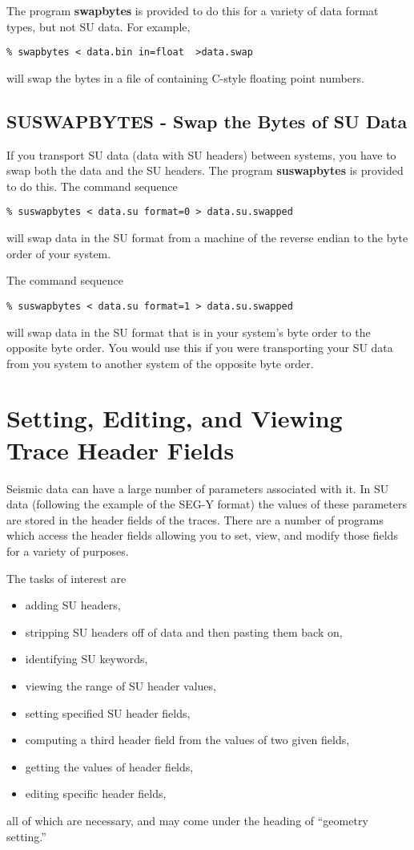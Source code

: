 {{{The program {\bf swapbytes\/} is provided to do this for a variety of
data format types, but not SU data. For example,
{\small\begin{verbatim}
% swapbytes < data.bin in=float  >data.swap
\end{verbatim}}\noindent
will swap the bytes in a file of containing C-style floating point numbers.

\subsection{SUSWAPBYTES - Swap the Bytes of SU Data}

If you transport SU data (data with SU headers) between systems,
you have to swap both the data and the SU headers. The program
{\bf suswapbytes\/} is provided to do this.
The command sequence
{\small\begin{verbatim}
% suswapbytes < data.su format=0 > data.su.swapped
\end{verbatim}}\noindent
will swap data in the SU format from a machine of the reverse endian
to the byte order of your system.

The command sequence
{\small\begin{verbatim}
% suswapbytes < data.su format=1 > data.su.swapped
\end{verbatim}}\noindent
will swap data in the SU format that is in your system's byte
order to the opposite byte order.
You would use this if you were transporting your SU data from
you system to another system of the opposite byte order.

\section{Setting, Editing, and Viewing Trace Header Fields}

Seismic data can have a large number of parameters associated with
it. In SU data (following the example of the SEG-Y format) the
values of these parameters are stored in the header fields
of the traces.
There are a number of programs which access the header fields
allowing you to set, view, and modify those fields for a variety
of purposes.

The tasks of interest are
\begin{itemize}
\item adding SU headers,
\item stripping SU headers off of data and then pasting them back on, 
\item identifying SU keywords,
\item viewing the range of SU header values,
\item setting specified SU header fields,
\item computing a third header field from the values of two given fields,
\item getting the values of header fields,
\item editing specific header fields,
\end{itemize}
all of which are necessary, and may come under the heading of 
``geometry setting.''

}}}
